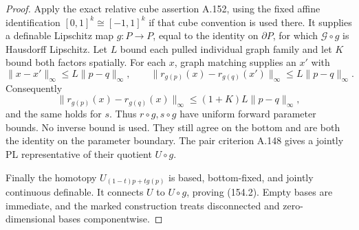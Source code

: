 \begin{proof}
Apply the exact relative cube assertion A.152, using the
fixed affine identification $[0,1]^k\cong[-1,1]^k$ if that
cube convention is used there. It supplies a definable
Lipschitz map $g:P\to P$, equal to the identity on
$\partial P$, for which $\mathcal G\circ g$ is Hausdorff
Lipschitz. Let $L$ bound each pulled individual graph
family and let $K$ bound both factors spatially.
For each $x$, graph matching supplies an $x'$ with
\[
 \|x-x'\|_\infty\le L\|p-q\|_\infty,\qquad
 \|r_{g(p)}(x)-r_{g(q)}(x')\|_\infty
                           \le L\|p-q\|_\infty.
\]
Consequently
\[
 \|r_{g(p)}(x)-r_{g(q)}(x)\|_\infty
                \le(1+K)L\|p-q\|_\infty,
 \tag{154.13}
\]
and the same holds for $s$. Thus $r\circ g,s\circ g$ have
uniform forward parameter bounds. No inverse bound is used.
They still agree on the bottom and are both the identity
on the parameter boundary. The pair criterion A.148 gives
a jointly PL representative of their quotient $U\circ g$.

Finally the homotopy
$U_{(1-t)p+t g(p)}$ is based, bottom-fixed, and jointly
continuous definable. It connects $U$ to $U\circ g$,
proving (154.2). Empty bases are immediate, and the marked
construction treats disconnected and zero-dimensional
bases componentwise.
\end{proof}


